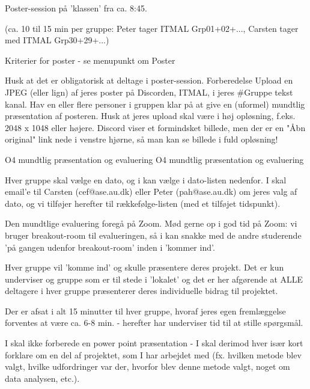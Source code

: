     Poster-session på 'klassen'  fra ca. 8:45.

    (ca. 10 til 15 min per gruppe: Peter tager ITMAL Grp01+02+..., Carsten tager med ITMAL Grp30+29+...)

    Kriterier for poster - se menupunkt om Poster

    Husk at det er obligatorisk at deltage i poster-session.
    Forberedelse
        Upload en JPEG (eller lign) af jeres poster på Discorden, ITMAL, i jeres #Gruppe tekst kanal. Hav en eller flere personer i gruppen klar på at give en (uformel) mundtlig præsentation af posteren.
            Husk at jeres upload skal være i høj opløsning, f.eks. 2048 x 1048 eller højere.
            Discord viser et formindsket billede, men der er en "Åbn original" link nede i venstre hjørne, så man kan se billede i fuld opløsning!

























O4 mundtlig præsentation og evaluering
O4 mundtlig præsentation og evaluering

Hver gruppe skal vælge en dato, og i kan vælge i dato-listen nedenfor. I skal email'e til Carsten (cef@ase.au.dk) eller Peter  (pah@ase.au.dk) om jeres valg af dato, og vi tilføjer herefter til rækkefølge-listen (med et tilføjet tidspunkt).

Den mundtlige evaluering foregå på Zoom. Mød gerne op i god tid på Zoom: vi bruger breakout-room til evalueringen, så i kan snakke med de andre studerende 'på gangen udenfor breakout-room' inden i 'kommer ind'.

Hver gruppe vil 'komme ind' og skulle præsentere deres projekt. Det er kun underviser og gruppe som er til stede i 'lokalet' og det er her afgørende at ALLE deltagere i hver gruppe præsenterer deres individuelle bidrag til projektet.

Der er afsat i alt 15 minutter til hver gruppe, hvoraf jeres egen fremlæggelse forventes at være ca. 6-8 min. - herefter har underviser tid til at stille spørgsmål.

I skal ikke forberede en power point præsentation - I skal derimod hver især kort forklare om en del af projektet, som I har arbejdet med (fx. hvilken metode blev valgt, hvilke udfordringer var der, hvorfor blev denne metode valgt, noget om data analysen, etc.).

